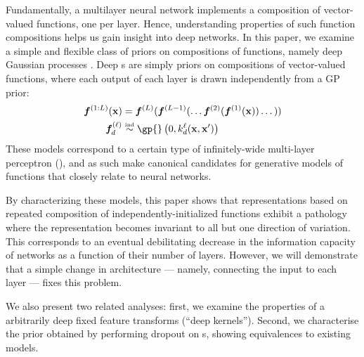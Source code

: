 Fundamentally, a multilayer neural network implements a composition of vector-valued functions, one per layer.
Hence, understanding properties of such function compositions helps us gain insight into deep networks.
In this paper, we examine a simple and flexible class of priors on compositions of functions, namely deep Gaussian processes \citep{damianou2012deep}.
Deep \gp{}s are simply priors on compositions of vector-valued functions, where each output of each layer is drawn independently from a GP prior:
%
\begin{align}
\vf^{(1:L)}(\vx) & = \vf^{(L)}(\vf^{(L-1)}(\dots \vf^{(2)}(\vf^{(1)}(\vx)) \dots)) \\
\vf_d^{(\layerindex)} & \simind \gp{} \left( 0, k^\layerindex_d(\vx, \vx') \right)
\label{eq:deep-gp}
\end{align}
%
These models correspond to a certain type of infinitely-wide multi-layer perceptron (\MLP{}), and as such make canonical candidates for generative models of functions that closely relate to neural networks.

By characterizing these models, this paper shows that representations based on repeated composition of independently-initialized functions exhibit a pathology where the representation becomes invariant to all but one direction of variation. This corresponds to an eventual debilitating decrease in the information capacity of networks as a function of their number of layers. However, we will demonstrate that a simple change in architecture --- namely, connecting the input to each layer --- fixes this problem. 

We also present two related analyses:  first, we examine the properties of a arbitrarily deep fixed feature transforms (``deep kernels'').  Second, we characterise the prior obtained by performing dropout on \gp{}s, showing equivalences to existing models.



